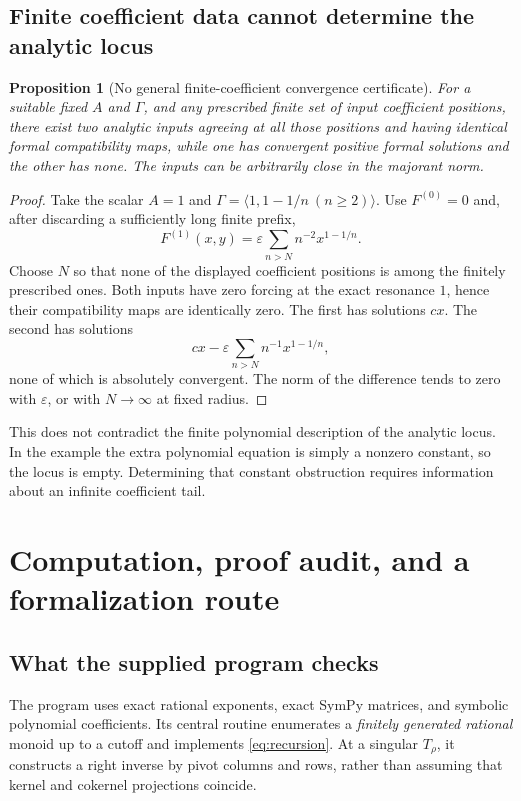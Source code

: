 \documentclass[11pt,a4paper]{article}
\numberwithin{equation}{section}
\newtheorem{proposition}[theorem]{Proposition}
\theoremstyle{definition}
\theoremstyle{remark}
\newcommand{\G}{\Gamma}
\begin{document}
\subsection{Finite coefficient data cannot determine the analytic locus}

\begin{proposition}[No general finite-coefficient convergence certificate]
\label{prop:no-finite}
For a suitable fixed $A$ and $\G$, and any prescribed finite set of input
coefficient positions, there exist two analytic inputs agreeing at all
those positions and having identical formal compatibility maps, while one
has convergent positive formal solutions and the other has none.
The inputs can be arbitrarily close in the majorant norm.
\end{proposition}
\begin{proof}
Take the scalar $A=1$ and
$\G=\langle1,1-1/n\ (n\geq2)\rangle$.
Use $F^{(0)}=0$ and, after discarding a sufficiently long finite prefix,
\[
 F^{(1)}(x,y)=\varepsilon\sum_{n>N}n^{-2}x^{1-1/n}.
\]
Choose $N$ so that none of the displayed coefficient positions is among
the finitely prescribed ones. Both inputs have zero forcing at the exact
resonance $1$, hence their compatibility maps are identically zero.
The first has solutions $cx$. The second has solutions
\[
 cx-\varepsilon\sum_{n>N}n^{-1}x^{1-1/n},
\]
none of which is absolutely convergent. The norm of the difference tends
to zero with $\varepsilon$, or with $N\to\infty$ at fixed radius.
\end{proof}

This does not contradict the finite polynomial description of the analytic
locus. In the example the extra polynomial equation is simply a nonzero
constant, so the locus is empty. Determining that constant obstruction
requires information about an infinite coefficient tail.

\section{Computation, proof audit, and a formalization route}
\label{sec:verification}

\subsection{What the supplied program checks}
The program  uses exact rational exponents,
exact SymPy matrices, and symbolic polynomial coefficients. Its central
routine enumerates a \emph{finitely generated rational} monoid up to a
cutoff and implements \eqref{eq:recursion}. At a singular $T_\rho$, it
constructs a right inverse by pivot columns and rows, rather than assuming
that kernel and cokernel projections coincide.
\end{document}
